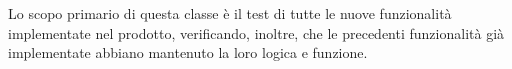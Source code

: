 Lo scopo primario di questa classe è il test di tutte le nuove funzionalità implementate nel prodotto, verificando, inoltre, che le precedenti funzionalità già implementate abbiano mantenuto la loro logica e funzione.